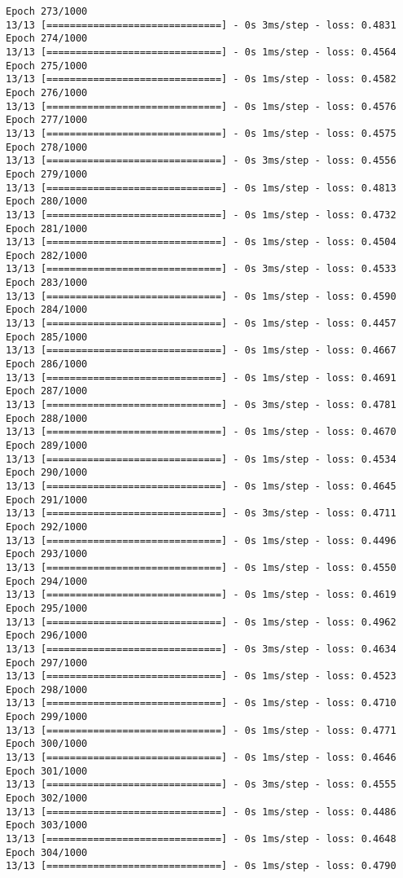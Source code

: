 \documentclass[11pt]{article}
\begin{document}
\begin{Verbatim}[commandchars=\\\{\}]
Epoch 273/1000
13/13 [==============================] - 0s 3ms/step - loss: 0.4831
Epoch 274/1000
13/13 [==============================] - 0s 1ms/step - loss: 0.4564
Epoch 275/1000
13/13 [==============================] - 0s 1ms/step - loss: 0.4582
Epoch 276/1000
13/13 [==============================] - 0s 1ms/step - loss: 0.4576
Epoch 277/1000
13/13 [==============================] - 0s 1ms/step - loss: 0.4575
Epoch 278/1000
13/13 [==============================] - 0s 3ms/step - loss: 0.4556
Epoch 279/1000
13/13 [==============================] - 0s 1ms/step - loss: 0.4813
Epoch 280/1000
13/13 [==============================] - 0s 1ms/step - loss: 0.4732
Epoch 281/1000
13/13 [==============================] - 0s 1ms/step - loss: 0.4504
Epoch 282/1000
13/13 [==============================] - 0s 3ms/step - loss: 0.4533
Epoch 283/1000
13/13 [==============================] - 0s 1ms/step - loss: 0.4590
Epoch 284/1000
13/13 [==============================] - 0s 1ms/step - loss: 0.4457
Epoch 285/1000
13/13 [==============================] - 0s 1ms/step - loss: 0.4667
Epoch 286/1000
13/13 [==============================] - 0s 1ms/step - loss: 0.4691
Epoch 287/1000
13/13 [==============================] - 0s 3ms/step - loss: 0.4781
Epoch 288/1000
13/13 [==============================] - 0s 1ms/step - loss: 0.4670
Epoch 289/1000
13/13 [==============================] - 0s 1ms/step - loss: 0.4534
Epoch 290/1000
13/13 [==============================] - 0s 1ms/step - loss: 0.4645
Epoch 291/1000
13/13 [==============================] - 0s 3ms/step - loss: 0.4711
Epoch 292/1000
13/13 [==============================] - 0s 1ms/step - loss: 0.4496
Epoch 293/1000
13/13 [==============================] - 0s 1ms/step - loss: 0.4550
Epoch 294/1000
13/13 [==============================] - 0s 1ms/step - loss: 0.4619
Epoch 295/1000
13/13 [==============================] - 0s 1ms/step - loss: 0.4962
Epoch 296/1000
13/13 [==============================] - 0s 3ms/step - loss: 0.4634
Epoch 297/1000
13/13 [==============================] - 0s 1ms/step - loss: 0.4523
Epoch 298/1000
13/13 [==============================] - 0s 1ms/step - loss: 0.4710
Epoch 299/1000
13/13 [==============================] - 0s 1ms/step - loss: 0.4771
Epoch 300/1000
13/13 [==============================] - 0s 1ms/step - loss: 0.4646
Epoch 301/1000
13/13 [==============================] - 0s 3ms/step - loss: 0.4555
Epoch 302/1000
13/13 [==============================] - 0s 1ms/step - loss: 0.4486
Epoch 303/1000
13/13 [==============================] - 0s 1ms/step - loss: 0.4648
Epoch 304/1000
13/13 [==============================] - 0s 1ms/step - loss: 0.4790

\end{Verbatim}
\end{document}
